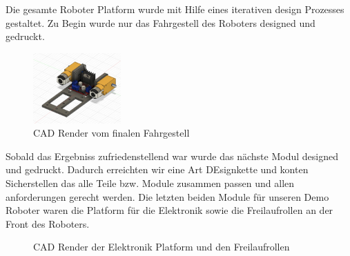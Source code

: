 \begin{flushleft}
    Die gesamte Roboter Platform wurde mit Hilfe eines iterativen design Prozesses gestaltet. 
    Zu Begin wurde nur das Fahrgestell des Roboters designed und gedruckt.

    \begin{figure}[h!]
        \centering
        \includegraphics[width=0.3\textwidth]{imgs/Roboter/CAD/Fahrgestell.jpg}
        \caption{CAD Render vom finalen Fahrgestell}
        \label{fig:cad_fahrgestell}%
    \end{figure}

    Sobald das Ergebniss zufriedenstellend war wurde das nächste Modul designed und gedruckt.
    Dadurch erreichten wir eine Art DEsignkette und konten Sicherstellen das alle Teile bzw. Module zusammen passen
    und allen anforderungen gerecht werden.
    Die letzten beiden Module für unseren Demo Roboter waren die Platform für die Elektronik sowie die Freilaufrollen
    an der Front des Roboters.

    \begin{figure}[h!]
        \centering
        \qquad
        \caption{CAD Render der Elektronik Platform und den Freilaufrollen}%
        \label{fig:example}%
    \end{figure}
\end{flushleft}